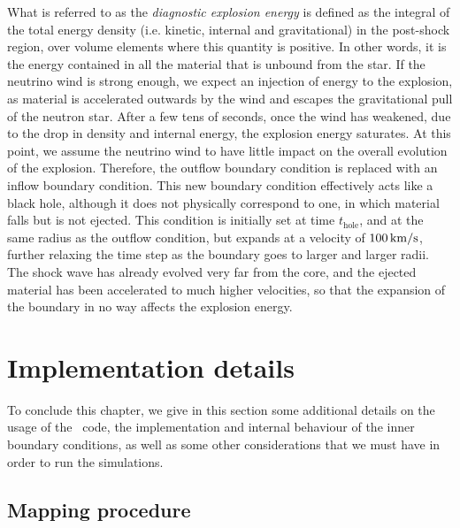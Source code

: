 What is referred to as the \emph{diagnostic explosion energy} is defined as the integral of the total energy density (i.e. kinetic, internal and gravitational) in the post-shock region, over volume elements where this quantity is positive. In other words, it is the energy contained in all the material that is unbound from the star. If the neutrino wind is strong enough, we expect an injection of energy to the explosion, as material is accelerated outwards by the wind and escapes the gravitational pull of the neutron star. After a few tens of seconds, once the wind has weakened, due to the drop in density and internal energy, the explosion energy saturates. At this point, we assume the neutrino wind to have little impact on the overall evolution of the explosion. Therefore, the outflow boundary condition is replaced with an inflow boundary condition. This new boundary condition effectively acts like a black hole, although it does not physically correspond to one, in which material falls but is not ejected. This condition is initially set at time \(t_\mathrm{hole}\), and at the same radius as the outflow condition, but expands at a velocity of \(100\,\mathrm{km/s}\), further relaxing the time step as the boundary goes to larger and larger radii. The shock wave has already evolved very far from the core, and the ejected material has been accelerated to much higher velocities, so that the expansion of the boundary in no way affects the explosion energy.

\section{Implementation details}

To conclude this chapter, we give in this section some additional details on the usage of the \flash\ code, the implementation and internal behaviour of the inner boundary conditions, as well as some other considerations that we must have in order to run the simulations.

\subsection{Mapping procedure} \label{sec:mapping}

